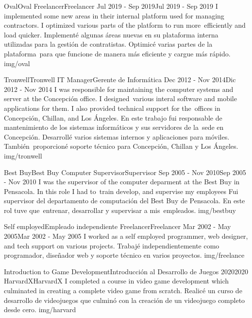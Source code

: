 \documentclass[paper=a4,fontsize=11pt]{includes}
\begin{document}
\sepspace

\WorkEntry
{Oval}{Oval}
{Freelancer}{Freelancer}
{Jul 2019 - Sep 2019}{Jul 2019 - Sep 2019}
{I implemented some new areas in their internal platform used for managing contractors. I optimized various parts of the platform to run more\
    efficiently and load quicker.}
{Implementé algunas áreas nuevas en su plataforma interna utilizadas para la gestión de contratistas. Optimicé varias partes de la plataforma\
    para que funcione de manera más eficiente y cargue más rápido.}
{img/oval}

\sepspace

\WorkEntry
	{Tronwell}{Tronwell}
	{IT Manager}{Gerente de Informática}
	{Dec 2012 - Nov 2014}{Dic 2012 - Nov 2014}
	{I was responsible for maintaining the computer systems and server at the Concepción office. I designed\
		various interal software and mobile applications for them. I also provided technical support for the\
		offices in Concepción, Chillan, and Los Ángeles.}
	{En este trabajo fui responsable de mantenimiento de los sistemas informáticos y sus servidores de la\
		sede en Concepción. Desarrollé varios sistemas internos y aplicaciones para móviles. También\
		proporcioné soporte técnico para Concepción, Chillan y Los Ángeles.}
	{img/tronwell}

\sepspace

\WorkEntry
	{Best Buy}{Best Buy}
	{Computer Supervisor}{Supervisor}
	{Sep 2005 - Nov 2010}{Sep 2005 - Nov 2010}
	{I was the supervisor of the computer deparment at the Best Buy in Pensacola. In this role I had to\
		train develop, and supervise my employees}
	{Fui supervisor del departamento de computación del Best Buy de Pensacola. En este rol tuve que\
		entrenar, desarrollar y supervisar a mis\
		empleados.}
	{img/bestbuy}

\sepspace

\WorkEntry
	{Self employed}{Empleado independiente}
	{Freelancer}{Freelancer}
	{Mar 2002 - May 2005}{Mar 2002 - May 2005}
	{I worked as a self employed programmer, web designer, and tech support on various projects.}
	{Trabajé independientemente como programador, diseñador web y soporte técnico en varios proyectos.}
	{img/freelance}


\noindent

\EducationEntry
    {Introduction to Game Development}{Introducción al Desarrollo de Juegos}
    {2020}{2020}
    {HarvardX}{HarvardX}
    {I completed a course in video game development which culminated in creating a complete video game from scratch.}
    {Realicé un curso de desarrollo de videojuegos que culminó con la creación de un videojuego completo desde cero.}
    {img/harvard}
\end{document}
